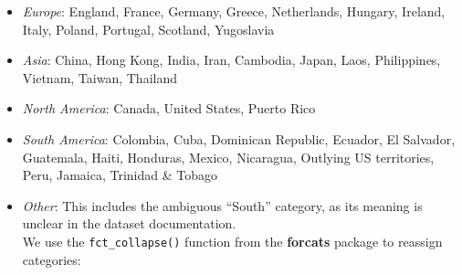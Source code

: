 \documentclass[
  11pt,
]{book}
\providecommand{\tightlist}{%
  \setlength{\itemsep}{0pt}\setlength{\parskip}{0pt}}
\theoremstyle{definition}
\theoremstyle{definition}
\theoremstyle{definition}
\theoremstyle{definition}
\theoremstyle{remark}
\begin{document}
\begin{itemize}
\tightlist
\item
  \emph{Europe}: England, France, Germany, Greece, Netherlands, Hungary, Ireland, Italy, Poland, Portugal, Scotland, Yugoslavia\\
\item
  \emph{Asia}: China, Hong Kong, India, Iran, Cambodia, Japan, Laos, Philippines, Vietnam, Taiwan, Thailand\\
\item
  \emph{North America}: Canada, United States, Puerto Rico\\
\item
  \emph{South America}: Colombia, Cuba, Dominican Republic, Ecuador, El Salvador, Guatemala, Haiti, Honduras, Mexico, Nicaragua, Outlying US territories, Peru, Jamaica, Trinidad \& Tobago\\
\item
  \emph{Other}: This includes the ambiguous ``South'' category, as its meaning is unclear in the dataset documentation.\\
  We use the \texttt{fct\_collapse()} function from the \textbf{forcats} package to reassign categories:
\end{itemize}
\end{document}
